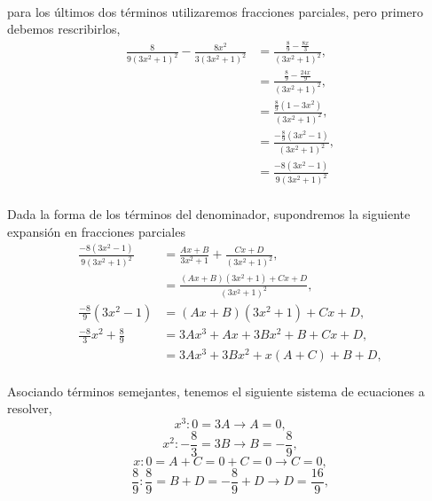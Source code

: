 \documentclass{article}
\begin{document}
\paragraph{} para los últimos dos términos utilizaremos fracciones parciales, pero primero debemos rescribirlos,
\begin{align*}
\frac{8}{9(3x^2 + 1)^2} - \frac{8x^2}{3(3x^2 + 1)^2} &= \frac{\frac{8}{9} - \frac{8x}{3}}{(3x^2 + 1)^2},\\
&= \frac{\frac{8}{9} - \frac{24x}{9}}{(3x^2 + 1)^2},\\
&= \frac{\frac{8}{9}(1 - 3x^2)}{(3x^2 + 1)^2},\\
&= \frac{-\frac{8}{9}(3x^2 - 1)}{(3x^2 + 1)^2},\\
&= \frac{-8(3x^2 - 1)}{9(3x^2 + 1)^2}
\end{align*}
\paragraph{}Dada la forma de los términos del denominador, supondremos la siguiente expansión en fracciones parciales
\begin{align*}
\frac{-8(3x^2 - 1)}{9(3x^2 + 1)^2} &= \frac{Ax + B}{3x^2 +1} + \frac{Cx + D}{(3x^2 + 1)^2},\\
&= \frac{(Ax + B)(3x^2 + 1) + Cx + D}{(3x^2 + 1)^2},\\
\frac{-8}{9}(3x^2 -1) &= (Ax + B)(3x^2 + 1) + Cx + D,\\
\frac{-8}{3}x^2 + \frac{8}{9} &= 3Ax^3 + Ax + 3Bx^2 + B + Cx + D,\\
&= 3Ax^3 + 3Bx^2 + x(A+C) + B + D,
\end{align*}
\paragraph{}Asociando términos semejantes, tenemos el siguiente sistema de ecuaciones a resolver,
\begin{equation}
x^3: 0 = 3A \rightarrow A = 0\label{eq:pfp_1},
\end{equation}
\begin{equation}
x^2: -\frac{8}{3} = 3B \rightarrow B = -\frac{8}{9}\label{eq:pfp_2},
\end{equation}
\begin{equation}
x: 0 = A + C = 0 + C = 0 \rightarrow C = 0\label{eq:pfp_3},
\end{equation}
\begin{equation}
\frac{8}{9}: \frac{8}{9} = B + D = -\frac{8}{9} + D \rightarrow D = \frac{16}{9}\label{eq:pfp_4},
\end{equation}
\end{document}

